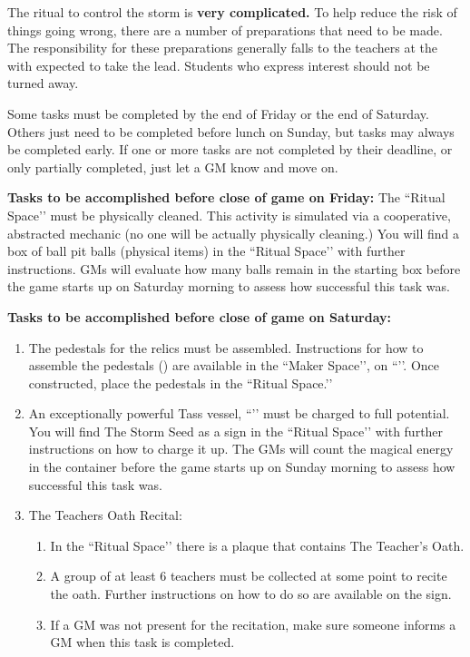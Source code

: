 \documentclass[green]{GL2020}
\begin{document}
\name{\gPreparingTheRitual{}}

The ritual to control the storm is \textbf{very complicated.} To help reduce the risk of things going wrong, there are a number of preparations that need to be made. The responsibility for these preparations generally falls to the teachers at the \pSchool{} with \cLibrarian{\full} expected to take the lead. Students who express interest should not be turned away.

Some tasks must be completed by the end of Friday or the end of Saturday. Others just need to be completed before lunch on Sunday, but tasks may always be completed early. If one or more tasks are not completed by their deadline, or only partially completed, just let a GM know and move on.

\textbf{Tasks to be accomplished before close of game on Friday:}
The ``Ritual Space’’ must be physically cleaned. This activity is simulated via a cooperative, abstracted mechanic (no one will be actually physically cleaning.) You will find a box of ball pit balls (physical items) in the ``Ritual Space’’ with further instructions. GMs will evaluate how many balls remain in the starting box before the game starts up on Saturday morning to assess how successful this task was.

\textbf{Tasks to be accomplished before close of game on Saturday:}
\begin{enumerate}
  \item The pedestals for the relics must be assembled. Instructions for how to assemble the pedestals (\iPedestalForRelic{}) are available in the ``Maker Space’’, on ``\sSignF{}’’. Once constructed, place the pedestals in the ``Ritual Space.’’
  \item An exceptionally powerful Tass vessel, ``\sStormSeed{}’’ must be charged to full potential. You will find The Storm Seed as a sign in the ``Ritual Space’’ with further instructions on how to charge it up. The GMs will count the magical energy in the container before the game starts up on Sunday morning to assess how successful this task was.
  \item The Teachers Oath Recital:
  \begin{enumerate}
    \item In the ``Ritual Space’’ there is a plaque that contains The Teacher’s Oath.
    \item A group of at least 6 teachers must be collected at some point to recite the oath. Further instructions on how to do so are available on the sign.
    \item If a GM was not present for the recitation, make sure someone informs a GM when this task is completed.
  \end{enumerate}
\end{enumerate}
\end{document}
